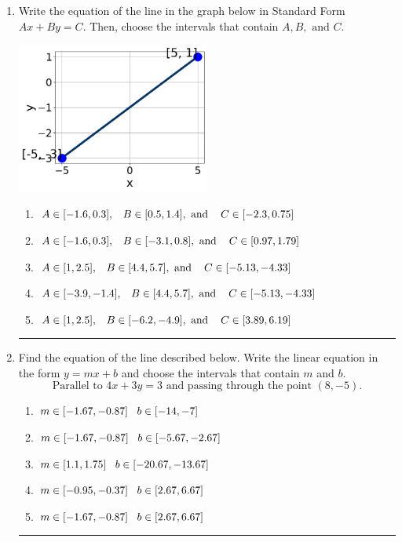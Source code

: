 \documentclass[14pt]{extbook}
\newcommand{\litem}[1]{\item#1\hspace*{-1cm}\rule{\textwidth}{0.4pt}}
\begin{document}
\begin{enumerate}
{\begin{enumerate}[label=\Alph*.]
\end{enumerate} }
\litem{
Write the equation of the line in the graph below in Standard Form $Ax+By=C$. Then, choose the intervals that contain $A, B, \text{ and } C$.
\begin{center}
    \includegraphics[width=0.5\textwidth]{../Figures/linearGraphToStandardA.png}
\end{center}
\begin{enumerate}[label=\Alph*.]
\item \( A \in [-1.6, 0.3], \hspace{3mm} B \in [0.5, 1.4], \text{ and } \hspace{3mm} C \in [-2.3, 0.75] \)
\item \( A \in [-1.6, 0.3], \hspace{3mm} B \in [-3.1, 0.8], \text{ and } \hspace{3mm} C \in [0.97, 1.79] \)
\item \( A \in [1, 2.5], \hspace{3mm} B \in [4.4, 5.7], \text{ and } \hspace{3mm} C \in [-5.13, -4.33] \)
\item \( A \in [-3.9, -1.4], \hspace{3mm} B \in [4.4, 5.7], \text{ and } \hspace{3mm} C \in [-5.13, -4.33] \)
\item \( A \in [1, 2.5], \hspace{3mm} B \in [-6.2, -4.9], \text{ and } \hspace{3mm} C \in [3.89, 6.19] \)

\end{enumerate} }
\litem{
Find the equation of the line described below. Write the linear equation in the form $ y=mx+b $ and choose the intervals that contain $m$ and $b$.\[ \text{Parallel to } 4 x + 3 y = 3 \text{ and passing through the point } (8, -5). \]\begin{enumerate}[label=\Alph*.]
\item \( m \in [-1.67, -0.87] \hspace*{3mm} b \in [-14, -7] \)
\item \( m \in [-1.67, -0.87] \hspace*{3mm} b \in [-5.67, -2.67] \)
\item \( m \in [1.1, 1.75] \hspace*{3mm} b \in [-20.67, -13.67] \)
\item \( m \in [-0.95, -0.37] \hspace*{3mm} b \in [2.67, 6.67] \)
\item \( m \in [-1.67, -0.87] \hspace*{3mm} b \in [2.67, 6.67] \)


\end{enumerate}}
\end{enumerate}
\end{document}
